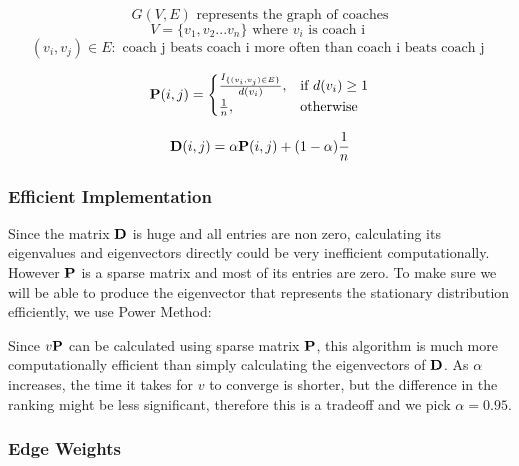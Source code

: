 \documentclass[11pt,notitlepage]{article}
\begin{document}
$$G(V, E) \mbox{ represents the graph of coaches}$$
$$V = \{v_1, v_2 ... v_n\} \mbox{ where } v_i \mbox{ is coach i }$$
$$(v_i, v_j) \in E : \mbox{ coach j beats coach i more often than coach i beats coach j }$$



\[
    {\bf P} (i, j)= 
\begin{cases}
    \frac{ I_{\{(v_i, v_j) \in E\}}}{d(v_i)},& \text{if } d(v_i) \geq 1\\
    \frac{1}{n},              & \text{otherwise}
\end{cases}
\]

$${\bf D} (i, j) = \alpha {\bf P} (i, j)  + (1-\alpha)\frac{1}{n}$$


\subsubsection*{Efficient Implementation}


Since the matrix ${\bf D}$ is huge and all entries are non zero, calculating its eigenvalues and eigenvectors directly could be very inefficient computationally. However ${\bf P}$ is a sparse matrix and most of its entries are zero. To make sure we will be able to produce the eigenvector that represents the stationary distribution efficiently, we use Power Method:

\vspace{5mm}

\begin{algorithm}[H]
\begin{algorithmic}
\EndWhile
{}
\end{algorithmic}
\end{algorithm}

\vspace{5mm}

\noindent Since $v {\bf P}$ can be calculated using sparse matrix ${\bf P}$, this algorithm is much more computationally efficient than simply calculating the eigenvectors of ${\bf D}$. As $\alpha$ increases, the time it takes for $v$ to converge is shorter, but the difference in the ranking might be less significant, therefore this is a tradeoff and we pick $\alpha = 0.95$.

\subsubsection*{Edge Weights}
\end{document}
